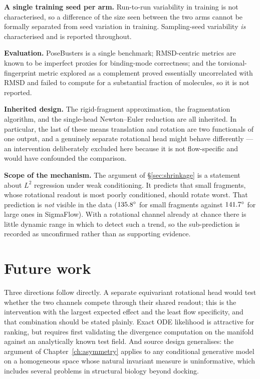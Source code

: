\textbf{A single training seed per arm.} Run-to-run variability in training is
not characterised, so a difference of the size seen between the two arms
cannot be formally separated from seed variation in training. Sampling-seed
variability \emph{is} characterised and is reported throughout.

\textbf{Evaluation.} PoseBusters is a single benchmark; RMSD-centric metrics
are known to be imperfect proxies for binding-mode correctness; and the
torsional-fingerprint metric explored as a complement proved essentially
uncorrelated with RMSD and failed to compute for a substantial fraction of
molecules, so it is not reported.

\textbf{Inherited design.} The rigid-fragment approximation, the fragmentation
algorithm, and the single-head Newton--Euler reduction are all inherited. In
particular, the last of these means translation and rotation are two
functionals of one output, and a genuinely separate rotational head might
behave differently --- an intervention deliberately excluded here because it is
not flow-specific and would have confounded the comparison.

\textbf{Scope of the mechanism.} The argument of \S\ref{sec:shrinkage} is a
statement about $L^2$ regression under weak conditioning. It predicts that
small fragments, whose rotational readout is most poorly conditioned, should
rotate worst. That prediction is \emph{not} visible in the data
($135.8^{\circ}$ for small fragments against $141.7^{\circ}$ for large ones in
SigmaFlow). With a rotational channel already at chance there is little
dynamic range in which to detect such a trend, so the sub-prediction is
recorded as unconfirmed rather than as supporting evidence.

\section{Future work}

Three directions follow directly. A separate equivariant rotational head would
test whether the two channels compete through their shared readout; this is
the intervention with the largest expected effect and the least flow
specificity, and that combination should be stated plainly. Exact ODE
likelihood is attractive for ranking, but requires first validating the
divergence computation on the manifold against an analytically known test
field. And source design generalises: the argument of
Chapter~\ref{ch:asymmetry} applies to any conditional generative model on a
homogeneous space whose natural invariant measure is uninformative, which
includes several problems in structural biology beyond docking.
